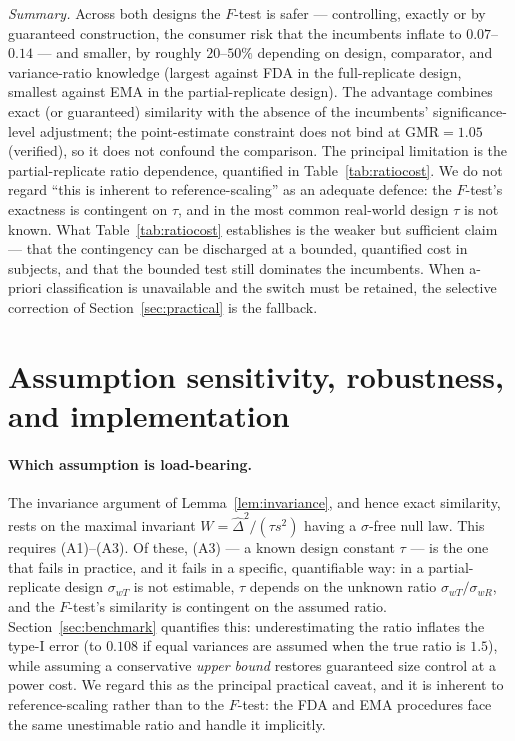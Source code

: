 \documentclass[11pt]{article}
\theoremstyle{remark}
\newcommand{\Dhat}{\hat{\Delta}}
\begin{document}
\emph{Summary.} Across both designs the $F$-test is safer --- controlling, exactly or by guaranteed construction, the consumer risk that the incumbents inflate to $0.07$--$0.14$ --- and smaller, by roughly $20$--$50\%$ depending on design, comparator, and variance-ratio knowledge (largest against FDA in the full-replicate design, smallest against EMA in the partial-replicate design). The advantage combines exact (or guaranteed) similarity with the absence of the incumbents' significance-level adjustment; the point-estimate constraint does not bind at $\mathrm{GMR}=1.05$ (verified), so it does not confound the comparison. The principal limitation is the partial-replicate ratio dependence, quantified in Table~\ref{tab:ratiocost}. We do not regard ``this is inherent to reference-scaling'' as an adequate defence: the $F$-test's exactness is contingent on $\tau$, and in the most common real-world design $\tau$ is not known. What Table~\ref{tab:ratiocost} establishes is the weaker but sufficient claim --- that the contingency can be discharged at a bounded, quantified cost in subjects, and that the bounded test still dominates the incumbents. When a-priori classification is unavailable and the switch must be retained, the selective correction of Section~\ref{sec:practical} is the fallback.

\section{Assumption sensitivity, robustness, and implementation}\label{sec:limitations}

\paragraph{Which assumption is load-bearing.} The invariance argument of Lemma~\ref{lem:invariance}, and hence exact similarity, rests on the maximal invariant $W=\Dhat^2/(\tau s^2)$ having a $\sigma$-free null law. This requires (A1)--(A3). Of these, (A3) --- a known design constant $\tau$ --- is the one that fails in practice, and it fails in a specific, quantifiable way: in a partial-replicate design $\sigma_{wT}$ is not estimable, $\tau$ depends on the unknown ratio $\sigma_{wT}/\sigma_{wR}$, and the $F$-test's similarity is contingent on the assumed ratio. Section~\ref{sec:benchmark} quantifies this: underestimating the ratio inflates the type-I error (to $0.108$ if equal variances are assumed when the true ratio is $1.5$), while assuming a conservative \emph{upper bound} restores guaranteed size control at a power cost. We regard this as the principal practical caveat, and it is inherent to reference-scaling rather than to the $F$-test: the FDA and EMA procedures face the same unestimable ratio and handle it implicitly.
\end{document}
